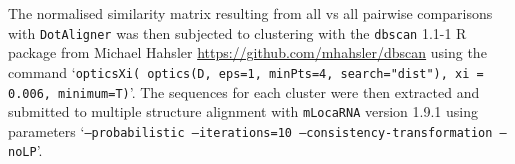 \documentclass{bmcart}
\newcommand\dotaligner{\texttt{DotAligner}}
\begin{document}
The normalised similarity matrix resulting from all vs all pairwise comparisons with \dotaligner{} was then 
subjected to clustering with the \texttt{dbscan} 1.1-1 R package from Michael Hahsler
 \url{https://github.com/mhahsler/dbscan} using the command `\texttt{opticsXi( optics(D, eps=1, minPts=4, search="dist"), xi = 0.006, minimum=T)}'. The sequences for each cluster were then extracted and submitted to multiple structure alignment with \texttt{mLocaRNA} version 1.9.1 using parameters  `\texttt{--probabilistic --iterations=10  --consistency-transformation --noLP}'.\\
 

\end{document}
